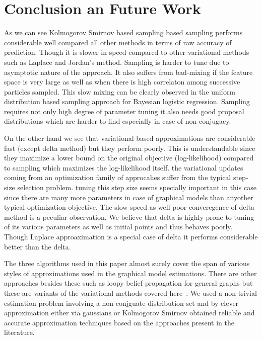 
\section{Conclusion an Future Work}
As we can see Kolmogorov Smirnov based sampling based sampling performs
considerable well compared all other methods in terms of raw accuracy of
prediction. Though it is slower in speed compared to other variational methods
such as Laplace and Jordan's method. Sampling is harder to tune due to
asymptotic nature of the approach. It also suffers from bad-mixing if the
feature space is very large as well as when there is high correlaton among
successive particles sampled. This slow mixing can be clearly observed in the
uniform distribution based sampling approach for Bayesian logistic regression.
Sampling requires not only high degree of parameter tuning it also needs good
proposal distributions which are harder to find especially in case of
non-conjugacy. 

On the other hand we see that variational based approximations are considerable
fast (except delta method) but they perform poorly. This is understandable since
they maximize a lower bound on the original objective (log-likelihood) compared
to sampling which maximizes the log-likelihood itself. the variational updates
coming from an optimization family of approcahes suffer from the typical
step-size selection problem. tuning this step size seems specially important in
this case since there are many more parameters in case of graphical models than
anyother typical optimization objective. The slow speed as well poor
converegence of delta method is a peculiar observation. We believe that delta is
highly prone to tuning of its various parameters as well as initial points and
thus behaves poorly. Though Laplace approaximation is a special case of delta it
performs considerable better than the delta. 

The three algorithms used in this paper almost surely cover the
span of various styles of approximations used in the graphical model
estimations. There are other approaches besides these such as
loopy belief propagation for general graphs but these are variants of the 
variational methods covered here~\cite{Heskes02}. We used a non-trivial
estimation problem involving a non-conjguate distribution set and by clever
approximation either via gaussians or Kolmogorov Smirnov obtained reliable and
accurate approximation techniques based on the approaches present in the
literature.

